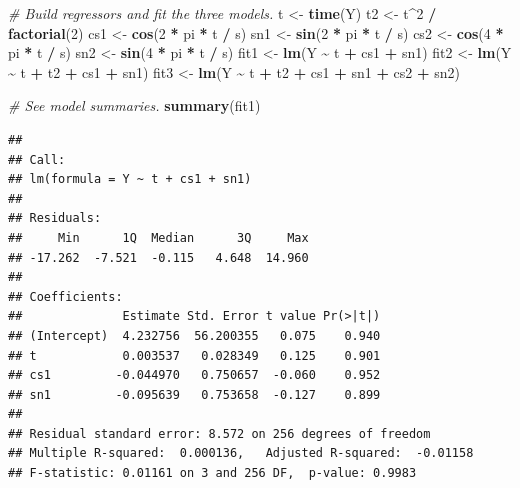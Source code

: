 \documentclass[
  10pt,
]{extarticle}
\newenvironment{Shaded}{\begin{snugshade}}{\end{snugshade}}
\newcommand{\CommentTok}[1]{\textcolor[rgb]{0.56,0.35,0.01}{\textit{#1}}}
\newcommand{\DecValTok}[1]{\textcolor[rgb]{0.00,0.00,0.81}{#1}}
\newcommand{\FunctionTok}[1]{\textcolor[rgb]{0.13,0.29,0.53}{\textbf{#1}}}
\newcommand{\NormalTok}[1]{#1}
\newcommand{\OtherTok}[1]{\textcolor[rgb]{0.56,0.35,0.01}{#1}}
\newcommand{\SpecialCharTok}[1]{\textcolor[rgb]{0.81,0.36,0.00}{\textbf{#1}}}
\begin{document}
\begin{Shaded}
\begin{Highlighting}[]
\CommentTok{\# Build regressors and fit the three models.}
\NormalTok{t    }\OtherTok{\textless{}{-}} \FunctionTok{time}\NormalTok{(Y)}
\NormalTok{t2   }\OtherTok{\textless{}{-}}\NormalTok{ t}\SpecialCharTok{\^{}}\DecValTok{2} \SpecialCharTok{/} \FunctionTok{factorial}\NormalTok{(}\DecValTok{2}\NormalTok{)}
\NormalTok{cs1  }\OtherTok{\textless{}{-}} \FunctionTok{cos}\NormalTok{(}\DecValTok{2} \SpecialCharTok{*}\NormalTok{ pi }\SpecialCharTok{*}\NormalTok{ t }\SpecialCharTok{/}\NormalTok{ s)}
\NormalTok{sn1  }\OtherTok{\textless{}{-}} \FunctionTok{sin}\NormalTok{(}\DecValTok{2} \SpecialCharTok{*}\NormalTok{ pi }\SpecialCharTok{*}\NormalTok{ t }\SpecialCharTok{/}\NormalTok{ s)}
\NormalTok{cs2  }\OtherTok{\textless{}{-}} \FunctionTok{cos}\NormalTok{(}\DecValTok{4} \SpecialCharTok{*}\NormalTok{ pi }\SpecialCharTok{*}\NormalTok{ t }\SpecialCharTok{/}\NormalTok{ s)}
\NormalTok{sn2  }\OtherTok{\textless{}{-}} \FunctionTok{sin}\NormalTok{(}\DecValTok{4} \SpecialCharTok{*}\NormalTok{ pi }\SpecialCharTok{*}\NormalTok{ t }\SpecialCharTok{/}\NormalTok{ s)}
\NormalTok{fit1 }\OtherTok{\textless{}{-}} \FunctionTok{lm}\NormalTok{(Y }\SpecialCharTok{\textasciitilde{}}\NormalTok{ t }\SpecialCharTok{+}\NormalTok{ cs1 }\SpecialCharTok{+}\NormalTok{ sn1)}
\NormalTok{fit2 }\OtherTok{\textless{}{-}} \FunctionTok{lm}\NormalTok{(Y }\SpecialCharTok{\textasciitilde{}}\NormalTok{ t }\SpecialCharTok{+}\NormalTok{ t2 }\SpecialCharTok{+}\NormalTok{ cs1 }\SpecialCharTok{+}\NormalTok{ sn1)}
\NormalTok{fit3 }\OtherTok{\textless{}{-}} \FunctionTok{lm}\NormalTok{(Y }\SpecialCharTok{\textasciitilde{}}\NormalTok{ t }\SpecialCharTok{+}\NormalTok{ t2 }\SpecialCharTok{+}\NormalTok{ cs1 }\SpecialCharTok{+}\NormalTok{ sn1 }\SpecialCharTok{+}\NormalTok{ cs2 }\SpecialCharTok{+}\NormalTok{ sn2)}

\CommentTok{\# See model summaries.}
\FunctionTok{summary}\NormalTok{(fit1)}
\end{Highlighting}
\end{Shaded}

\begin{verbatim}
## 
## Call:
## lm(formula = Y ~ t + cs1 + sn1)
## 
## Residuals:
##     Min      1Q  Median      3Q     Max 
## -17.262  -7.521  -0.115   4.648  14.960 
## 
## Coefficients:
##              Estimate Std. Error t value Pr(>|t|)
## (Intercept)  4.232756  56.200355   0.075    0.940
## t            0.003537   0.028349   0.125    0.901
## cs1         -0.044970   0.750657  -0.060    0.952
## sn1         -0.095639   0.753658  -0.127    0.899
## 
## Residual standard error: 8.572 on 256 degrees of freedom
## Multiple R-squared:  0.000136,   Adjusted R-squared:  -0.01158 
## F-statistic: 0.01161 on 3 and 256 DF,  p-value: 0.9983
\end{verbatim}
\end{document}

